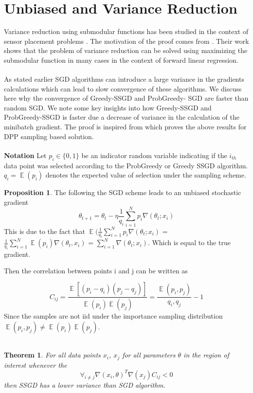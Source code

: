 \documentclass[a4paper,twoside]{iiththesis}
\newtheorem{theorem}{Theorem}
\theoremstyle{definition}
\theoremstyle{definition}
\newtheorem{prop}{Proposition}
\theoremstyle{remark}
\DeclareMathOperator*{\E}{\mathop{\mathbb{E}}}
\begin{document}
\section{Unbiased and Variance Reduction}
Variance reduction using submodular functions has been studied in the context of sensor placement problems \cite{krause2008near}. The motivation of the proof comes from \cite{das2008algorithms}.  Their work shows that the problem of variance reduction can be solved using maximizing the submodular function in many cases in the context of forward linear regression.  \\\\
As stated earlier SGD algorithms can introduce a large variance in the gradients calculations which can lead to slow convergence of these algorithms.   We discuss here why the convergence of Greedy-SSGD and ProbGreedy-
SGD are faster than random SGD. We note some key insights into how Greedy-SSGD and ProbGreedy-SSGD is faster due a decrease of variance in the calculation of the minibatch gradient.
The proof is inspired from \cite{zhangdiversified} which proves the above results for DPP sampling based solution. \\\\
\textbf{Notation} Let $p_i \in \{0, 1\}$ be an indicator random variable indicating if the $i_{th}$ data point was selected according to the ProbGreedy or Greedy SSGD  algorithm. $q_i = \E(p_i)$ denotes the expected value of selection under the sampling scheme.

\begin{prop}
The following the SGD scheme leads to an unbiased stochastic gradient
\begin{equation}
	\theta_{t+1} = \theta_t - \eta \frac{1}{q_i} \sum_{i=1}^N p_i \nabla (\theta_t; x_i)
\end{equation}
This is due to the fact that $\E(\frac{1}{q_i} \sum_{i=1}^N p_i \nabla(\theta_t; x_i)$ =$\frac{1}{q_i}\sum_{i=1}^N \E(p_i) \nabla(\theta_t, x_i)$ = $\sum_{i=1}^N \nabla(\theta_t; x_i)$. Which is equal to the true gradient.
\end{prop}
\newpage
Then the correlation between points i and j can be written as 

\begin{equation}
	C_{ij} = \frac{\E[(p_i - q_i) (p_j - q_j)]}{\E(p_i)\E(p_j)} = \frac{\E(p_i, p_j)}{q_i, q_j} -1
\end{equation}
Since the samples are not iid under the importance sampling distribution $\E(p_i, p_j) \neq \E(p_i) \E(p_j)$.
\\\\
\begin{theorem}
For all data points $x_i$, $x_j$ for all parameters $\theta$ in the region of interest whenever the 
\begin{equation}
\forall_{i\neq j} \nabla(x_i, \theta)^T \nabla(x_j) C_{ij} < 0
\end{equation}
 then  SSGD has a lower variance than  SGD algorithm.
\end{theorem}
\end{document}
